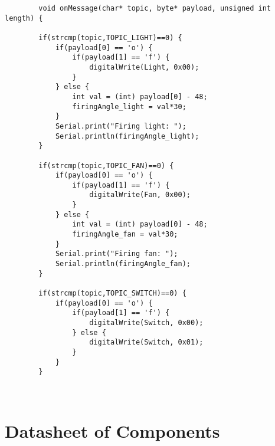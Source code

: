 \begin{lstlisting}
        void onMessage(char* topic, byte* payload, unsigned int length) {
        
        if(strcmp(topic,TOPIC_LIGHT)==0) {
	        if(payload[0] == 'o') {
		        if(payload[1] == 'f') {
		        	digitalWrite(Light, 0x00);
		        }
		    } else {
			    int val = (int) payload[0] - 48;
			    firingAngle_light = val*30;
	        }
	        Serial.print("Firing light: ");
	        Serial.println(firingAngle_light);
        }
        
        if(strcmp(topic,TOPIC_FAN)==0) {
        	if(payload[0] == 'o') {
        		if(payload[1] == 'f') {
        			digitalWrite(Fan, 0x00);
        		}
        	} else {
        		int val = (int) payload[0] - 48;
        		firingAngle_fan = val*30;
        	}
        	Serial.print("Firing fan: ");
        	Serial.println(firingAngle_fan);
        }
        
        if(strcmp(topic,TOPIC_SWITCH)==0) {
        	if(payload[0] == 'o') {
        		if(payload[1] == 'f') {
        			digitalWrite(Switch, 0x00);
        		} else {
        			digitalWrite(Switch, 0x01);
        		}
        	}
        }
        
        
        \end{lstlisting}
        
        \section{Datasheet of Components}
	        
        	
        	
        	
        	
    